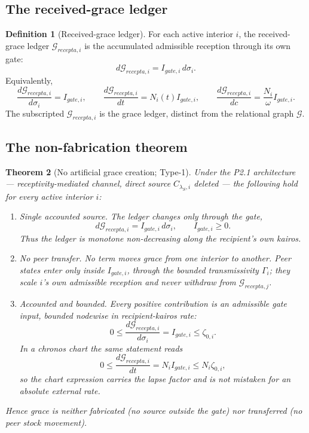 \documentclass[11pt,a4paper]{article}
\def\mathfrak#1{#1}%
\def\mathrm#1{#1}%
\def\emph#1{#1}%
\theoremstyle{definition}
\newtheorem{definition}{Definition}[section]
\theoremstyle{plain}
\newtheorem{theorem}[definition]{Theorem}
\theoremstyle{remark}
\begin{document}
\subsection{The received-grace ledger}

\begin{definition}[Received-grace ledger]\label{def:ledger}
For each active interior \(i\), the received-grace ledger
\(\mathcal G_{\mathrm{recepta},i}\) is the accumulated admissible reception through
its own gate:
\[
\boxed{\;
d\mathcal G_{\mathrm{recepta},i}
=
I_{\mathrm{gate},i}\,d\sigma_i.
\;}
\]
Equivalently,
\[
\frac{d\mathcal G_{\mathrm{recepta},i}}{d\sigma_i}
=
I_{\mathrm{gate},i},
\qquad
\frac{d\mathcal G_{\mathrm{recepta},i}}{dt}
=
N_i(t)I_{\mathrm{gate},i},
\qquad
\frac{d\mathcal G_{\mathrm{recepta},i}}{d\mathfrak c}
=
\frac{N_i}{\omega}I_{\mathrm{gate},i}.
\]
The subscripted \(\mathcal G_{\mathrm{recepta},i}\) is the grace ledger, distinct
from the relational graph \(\mathcal G\).
\end{definition}

\subsection{The non-fabrication theorem}

\begin{theorem}[No artificial grace creation; Type-1]\label{thm:nofab}
Under the P2.1 architecture --- receptivity-mediated channel, direct source
\(C_{\lambda_S,i}\) deleted --- the following hold for every active interior \(i\):
\begin{enumerate}[label=\textup{(\alph*)},leftmargin=1.2cm]
\item \emph{Single accounted source.} The ledger changes only through the gate,
\[
d\mathcal G_{\mathrm{recepta},i}
=
I_{\mathrm{gate},i}\,d\sigma_i,
\qquad
I_{\mathrm{gate},i}\ge0.
\]
Thus the ledger is monotone non-decreasing along the recipient's own kairos.

\item \emph{No peer transfer.} No term moves grace from one interior to another.
Peer states enter only inside \(I_{\mathrm{gate},i}\), through the bounded
transmissivity \(\Gamma_i\); they scale \(i\)'s own admissible reception and never
withdraw from \(\mathcal G_{\mathrm{recepta},j}\).

\item \emph{Accounted and bounded.} Every positive contribution is an admissible
gate input, bounded nodewise in recipient-kairos rate:
\[
0
\le
\frac{d\mathcal G_{\mathrm{recepta},i}}{d\sigma_i}
=
I_{\mathrm{gate},i}
\le
\zeta_{0,i}.
\]
In a chronos chart the same statement reads
\[
0
\le
\frac{d\mathcal G_{\mathrm{recepta},i}}{dt}
=
N_iI_{\mathrm{gate},i}
\le
N_i\zeta_{0,i},
\]
so the chart expression carries the lapse factor and is not mistaken for an
absolute external rate.
\end{enumerate}
Hence grace is neither fabricated (no source outside the gate) nor transferred
(no peer stock movement).
\end{theorem}
\end{document}
